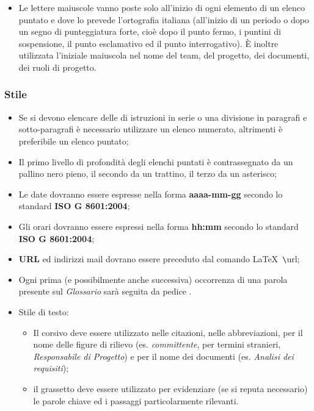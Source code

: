 \begin{itemize}

\item Le lettere maiuscole vanno poste solo all'inizio di ogni elemento di un elenco puntato e dove lo prevede l'ortografia italiana (all'inizio di un periodo o dopo un segno di punteggiatura forte, cioè dopo il punto fermo, i puntini di sospensione, il punto esclamativo ed il punto interrogativo). È inoltre utilizzata l'iniziale maiuscola nel nome del team, del progetto, dei documenti, dei ruoli di progetto.


\end{itemize}

\subsubsection{Stile}
\begin{itemize}
\item Se si devono elencare delle di istruzioni in serie o una divisione in paragrafi e sotto-paragrafi è necessario utilizzare un elenco numerato, altrimenti è preferibile un elenco puntato;

\item Il primo livello di profondità degli elenchi puntati è contrassegnato da un pallino nero pieno, il secondo da un trattino, il terzo da un asterisco;

\item Le date dovranno essere espresse nella forma \textbf{aaaa-mm-gg} secondo lo standard  \textbf{ISO G 8601:2004};

\item Gli orari dovranno essere espressi nella forma \textbf{hh:mm} secondo lo standard \textbf{ISO G 8601:2004};

\item \textbf{URL} ed indirizzi mail dovrano essere preceduto dal comando \LaTeX \verb+ \+url;

\item Ogni prima (e possibilmente anche successiva) occorrenza di una parola presente sul \textit{Glossario} sarà seguita da pedice .

\item Stile di testo:

\begin{itemize}

\item Il corsivo deve essere utilizzato nelle citazioni, nelle abbreviazioni, per il nome delle figure di rilievo (es. \textit{committente}, per termini stranieri, \textit{Responsabile di Progetto}) e per il nome dei documenti (es. \textit{Analisi dei requisiti});

\item il grassetto deve essere utilizzato per evidenziare (se si reputa necessario) le parole chiave ed i passaggi particolarmente rilevanti.

\end{itemize}

\end{itemize}
